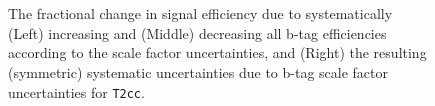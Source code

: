 \begin{figure}[h!]
\begin{center}
{    }
    \\
    \\
    \caption{\label{fig:sms-btag-t2cc}The fractional change in signal
      efficiency due to systematically (Left) increasing and (Middle)
      decreasing all b-tag efficiencies according to the scale factor
      uncertainties, and (Right) the resulting (symmetric) systematic
      uncertainties due to b-tag scale factor uncertainties for
      \texttt{T2cc}.} 
  \end{center}
\end{figure}

